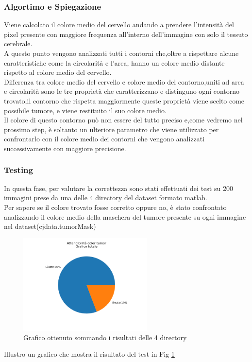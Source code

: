 \documentclass{article}
\begin{document}
\subsubsection{Algortimo e Spiegazione}
Viene calcolato il colore medio del cervello andando a prendere l'intensità del pixel presente con maggiore frequenza all'interno dell'immagine con solo il tessuto cerebrale.\\
A questo punto vengono analizzati tutti i contorni che,oltre a rispettare alcune caratteristiche come la circolarità e l'area, hanno un colore medio distante rispetto al colore medio del cervello.\\
Differenza tra colore medio del cervello e colore medio del contorno,uniti ad area e circolarità sono le tre proprietà che caratterizzano e distinguno ogni contorno trovato,il contorno che rispetta maggiormente queste proprietà viene scelto come possibile tumore, e viene restituito il suo colore medio.\\
Il colore di questo contorno può non essere del tutto preciso e,come vedremo nel prossimo step, è soltanto un ulteriore parametro che viene utilizzato per confrontarlo con il colore medio dei contorni che vengono analizzati successivamente con maggiore precisione.
\subsubsection{Testing}
In questa fase, per valutare la correttezza sono stati effettuati dei test su 200 immagini prese da una delle 4 directory del dataset formato matlab.\\
Per sapere se il colore trovato fosse corretto oppure no, è stato confrontato analizzando il colore medio della maschera del tumore presente su ogni immagine nel dataset(cjdata.tumorMask)\\
\begin{figure}
\centering
\includegraphics[width=0.6\textwidth]{ct.png}
\caption{\label{fig:ct} Grafico ottenuto sommando i risultati delle 4 directory}
\end{figure}
Illustro un grafico che mostra il risultato del test in Fig \ref{fig:ct}\\
\end{document}
